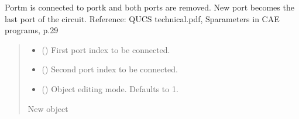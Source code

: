 \documentclass[letterpaper,10pt,english]{sphinxmanual}
\begin{document}
\begin{fulllineitems}
\begin{fulllineitems}
\begin{quote}
\begin{description}
\sphinxAtStartPar
{\hyperref[\detokenize{touchstone:touchstone.spfile}]{}}

\end{description}\end{quote}

\end{fulllineitems}


\begin{fulllineitems}
\label{\detokenize{touchstone:touchstone.spfile.connect_2_ports_retain}}
\pysigstartsignatures
{}
\pysigstopsignatures
\sphinxAtStartPar
Port\sphinxhyphen{}m is connected to port\sphinxhyphen{}k and both ports are removed. New port becomes the last port of the circuit.
Reference: QUCS technical.pdf, S\sphinxhyphen{}parameters in CAE programs, p.29
\begin{quote}\begin{description}
\begin{itemize}
\item {} 
\sphinxAtStartPar
{} () \textendash{} First port index to be connected.

\item {} 
\sphinxAtStartPar
{} () \textendash{} Second port index to be connected.

\item {} 
\sphinxAtStartPar
{} (\sphinxstyleliteralemphasis{\sphinxupquote{, }}) \textendash{} Object editing mode. Defaults to \sphinxhyphen{}1.

\end{itemize}

\sphinxAtStartPar
New  object

\sphinxAtStartPar
{\hyperref[\detokenize{touchstone:touchstone.spfile}]{}}


\end{description}
\end{quote}
\end{fulllineitems}
\end{fulllineitems}
\end{document}
